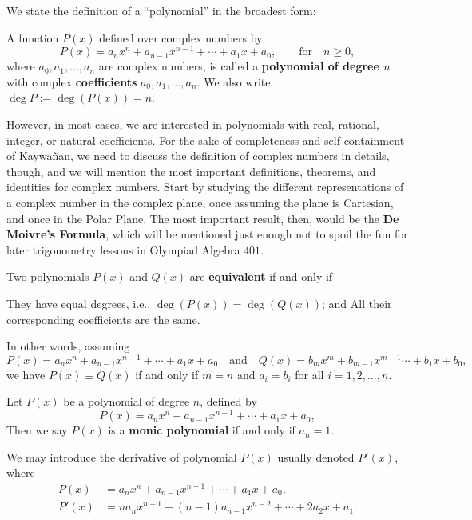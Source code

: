 \begin{tcolorbox}[title={Definition of Polynomial and Roots}]
We state the definition of a ``polynomial'' in the broadest form:
    \begin{definition}
    A function $P(x)$ defined over complex numbers by
    \[P(x)=a_nx^n+a_{n-1}x^{n-1}+\cdots+a_1x+a_0, \qquad \text{for} \quad n \geq 0,\]
    where $a_0,a_1,\dots,a_n$ are complex numbers, is called a \textbf{polynomial of degree $n$} with complex \textbf{coefficients} $a_0,a_1,\dots,a_n$. We also write $\deg P := \deg(P(x)) = n$.
    \end{definition}
\end{tcolorbox}

However, in most cases, we are interested in polynomials with real, rational, integer, or natural coefficients. For the sake of completeness and self-containment of Kaywañan, we need to discuss the definition of complex numbers in details, though, and we will mention the most important definitions, theorems, and identities for complex numbers. Start by studying the different representations of a complex number in the complex plane, once assuming the plane is Cartesian, and once in the Polar Plane. The most important result, then, would be the \textbf{De Moivre's Formula}, which will be mentioned just enough not to spoil the fun for later trigonometry lessons in Olympiad Algebra $401$.


\begin{tcolorbox}[title={Equivalent Polynomials, Monic Polynomials}]
    \begin{definition}
        Two polynomials $P(x)$ and $Q(x)$ are \textbf{equivalent} if and only if 
        \begin{tasks}
            \task They have equal degrees, i.e., $\deg(P(x))=\deg(Q(x))$; and
            \task All their corresponding coefficients are the same.
        \end{tasks}
        In other words, assuming
        \[P(x)=a_nx^n+a_{n-1}x^{n-1}+\cdots+a_1x+a_0 \quad \text{and} \quad Q(x)=b_mx^m+b_{m-1}x^{m-1}\cdots+b_1x+b_0,\]
        we have $P(x) \equiv Q(x)$ if and only if $m=n$ and $a_i=b_i$ for all $i=1,2,\dots,n$.
    \end{definition}

    \begin{definition}
    Let $P(x)$ be a polynomial of degree $n$, defined by
        \[P(x)=a_nx^n+a_{n-1}x^{n-1}+\cdots+a_1x+a_0,\]
    Then we say $P(x)$ is a \textbf{monic polynomial} if and only if $a_n=1$.
    \end{definition}

    \begin{definition}
        We may introduce the derivative of polynomial $P(x)$ usually denoted $P'(x)$, where
        \begin{align*}
            P(x) &= a_nx^n+a_{n-1}x^{n-1}+\cdots+a_1x+a_0,\\
            P'(x) &= na_nx^{n-1} + (n-1)a_{n-1}x^{n-2}+\cdots + 2a_2x+a_1.
        \end{align*}
    \end{definition}
\end{tcolorbox}

